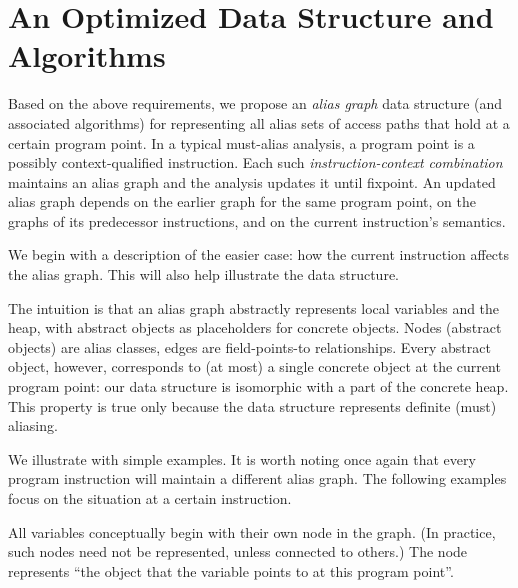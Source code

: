\section{An Optimized Data Structure and Algorithms}
\label{sec:datastructure}

Based on the above requirements, we propose an \emph{alias graph} data
structure (and associated algorithms) for representing all alias sets
of access paths that hold at a certain program point. In a typical
must-alias analysis, a program point is a possibly context-qualified
instruction. Each such \emph{instruction-context combination} maintains an
alias graph and the analysis updates it until fixpoint. An updated
alias graph depends on the earlier graph for the same program point,
on the graphs of its predecessor instructions, and on the current
instruction's semantics.

We begin with a description of the easier case: how the current
instruction affects the alias graph. This will also help illustrate
the data structure.

The intuition is that an alias graph abstractly represents local
variables and the heap, with abstract objects as placeholders for
concrete objects. Nodes (abstract objects) are alias classes, edges
are field-points-to relationships. Every abstract object, however,
corresponds to (at most) a single concrete object at the current program point:
our data structure is isomorphic with a part of the concrete heap.
This property is true only because the data structure represents
definite (must) aliasing.

We illustrate with simple examples. It is worth noting once again that
every program instruction will maintain a different alias graph. The following
examples focus on the situation at a certain instruction.

All variables conceptually begin
with their own node in the graph. (In practice, such nodes need not be
represented, unless connected to others.)  The node represents ``the
object that the variable points to at this program point''.

